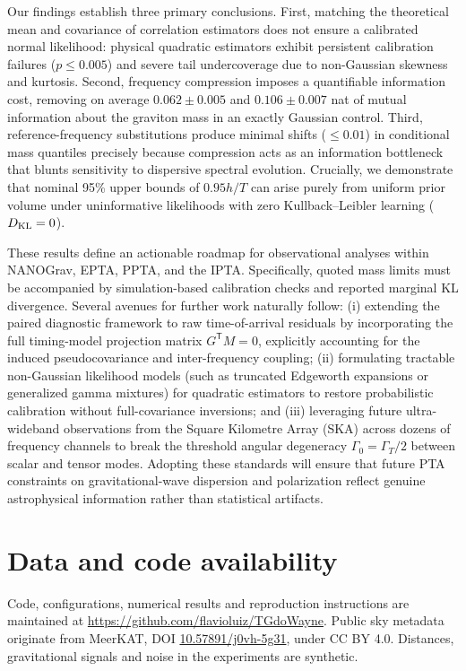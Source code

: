 \documentclass[11pt,a4paper]{article}
\begin{document}
Our findings establish three primary conclusions. First, matching the theoretical mean and covariance of correlation estimators does not ensure a calibrated normal likelihood: physical quadratic estimators exhibit persistent calibration failures ($p \le 0.005$) and severe tail undercoverage due to non-Gaussian skewness and kurtosis. Second, frequency compression imposes a quantifiable information cost, removing on average $0.062 \pm 0.005$ and $0.106 \pm 0.007$ nat of mutual information about the graviton mass in an exactly Gaussian control. Third, reference-frequency substitutions produce minimal shifts ($\le 0.01$) in conditional mass quantiles precisely because compression acts as an information bottleneck that blunts sensitivity to dispersive spectral evolution. Crucially, we demonstrate that nominal 95\% upper bounds of $0.95 h/T$ can arise purely from uniform prior volume under uninformative likelihoods with zero Kullback--Leibler learning ($D_{\rm KL} = 0$).

These results define an actionable roadmap for observational analyses within NANOGrav, EPTA, PPTA, and the IPTA. Specifically, quoted mass limits must be accompanied by simulation-based calibration checks and reported marginal KL divergence. Several avenues for further work naturally follow: (i) extending the paired diagnostic framework to raw time-of-arrival residuals by incorporating the full timing-model projection matrix $G^{\mathsf T}M = 0$, explicitly accounting for the induced pseudocovariance and inter-frequency coupling; (ii) formulating tractable non-Gaussian likelihood models (such as truncated Edgeworth expansions or generalized gamma mixtures) for quadratic estimators to restore probabilistic calibration without full-covariance inversions; and (iii) leveraging future ultra-wideband observations from the Square Kilometre Array (SKA) across dozens of frequency channels to break the threshold angular degeneracy $\Gamma_0 = \Gamma_T/2$ between scalar and tensor modes. Adopting these standards will ensure that future PTA constraints on gravitational-wave dispersion and polarization reflect genuine astrophysical information rather than statistical artifacts.

\section*{Data and code availability}
Code, configurations, numerical results and reproduction instructions are maintained at \url{https://github.com/flavioluiz/TGdoWayne}. Public sky metadata originate from MeerKAT, DOI \href{https://doi.org/10.57891/j0vh-5g31}{10.57891/j0vh-5g31}, under CC BY 4.0. Distances, gravitational signals and noise in the experiments are synthetic.
\end{document}
